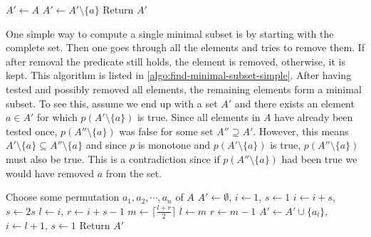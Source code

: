 \begin{algorithm}[ht]
  \begin{algorithmic}
    \State $A' \gets A$
        \State $A' \gets A' \setminus \{ a \}$
      \EndIf
    \EndFor
    \State Return $A'$
  \end{algorithmic}
  \caption{$\textsc{SimpleFindMinimalSubset}(A, p)$}
  \label{algo:find-minimal-subset-simple}
\end{algorithm}

One simple way to compute a single minimal subset is by starting with the complete set. Then one goes through all the elements and tries to remove them. If after removal the predicate still holds, the element is removed, otherwise, it is kept. This algorithm is listed in \cref{algo:find-minimal-subset-simple}. After having tested and possibly removed all elements, the remaining elements form a minimal subset. To see this, assume we end up with a set $A'$ and there exists an element $a \in A'$ for which $p(A' \setminus \{ a \})$ is true. Since all elements in $A$ have already been tested once, $p(A'' \setminus \{ a \})$ was false for some set $A'' \supseteq A'$. However, this means $A' \setminus \{ a \} \subseteq A'' \setminus \{ a \}$ and since $p$ is monotone and $p(A' \setminus \{ a \})$ is true, $p(A'' \setminus \{ a \})$ must also be true. This is a contradiction since if $p(A'' \setminus \{ a \})$ had been true we would have removed $a$ from the set.

\begin{algorithm}[ht]
  \begin{algorithmic}
    \State Choose some permutation $a_1, a_2, \cdots, a_n$ of $A$
    \State $A' \gets \emptyset$, \enspace $i \gets 1$, \enspace $s \gets 1$
        \State $i \gets i + s$, \enspace $s \gets 2 s$
      \Else
        \State $l \gets i$, \enspace $r \gets i + s - 1$
          \State $m \gets \lceil \frac{l + r}{2} \rceil$
            \State $l \gets m$
          \Else
            \State $r \gets m - 1$
          \EndIf
        \EndWhile
        \State $A' \gets A' \cup \{ a_l \}$, \enspace $i \gets l + 1$, \enspace $s \gets 1$
      \EndIf
    \EndWhile
    \State Return $A'$
  \end{algorithmic}
  \caption{$\textsc{FindMinimalSubset}(A, p)$}
  \label{algo:find-minimal-subset}
\end{algorithm}


